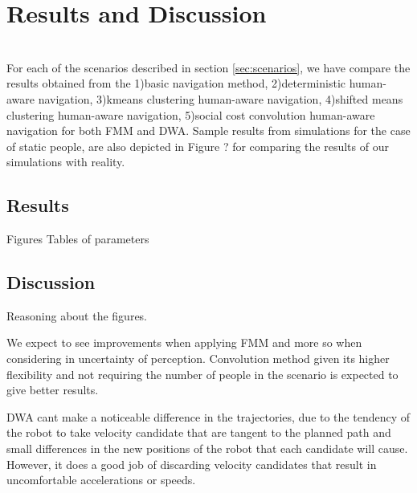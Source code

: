 \section{Results and Discussion}
\\

For each of the scenarios described in section \ref{sec:scenarios}, we have compare the results obtained from the 1)basic navigation method, 2)deterministic human-aware navigation, 3)kmeans clustering human-aware navigation, 4)shifted means clustering human-aware navigation, 5)social cost convolution human-aware navigation for both FMM and DWA. 
Sample results from simulations for the case of static people, are also depicted in Figure ? for comparing the results of our simulations with reality.




\subsection{Results}
\label{sec:results}

Figures
Tables of parameters







\subsection{Discussion}
\label{sec:discussion}

Reasoning about the figures.

We expect to see improvements when applying FMM and more so when considering in uncertainty of perception. Convolution method given its higher flexibility and not requiring the number of people in the scenario is expected to give better results.

DWA cant make a noticeable difference in the trajectories, due to the tendency of the robot to take velocity candidate that are tangent to the planned path and small differences in the new positions of the robot that each candidate will cause. However, it does a good job of discarding velocity candidates that result in uncomfortable accelerations or speeds.